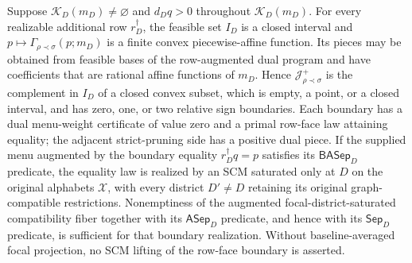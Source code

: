 Suppose \(\mathcal K_D(m_D)\ne\varnothing\) and \(d_Dq>0\) throughout \(\mathcal K_D(m_D)\). For every realizable additional row \(r_D^\dagger\), the feasible set \(I_D\) is a closed interval and \(p\mapsto\Gamma_{\rho\prec\sigma}(p;m_D)\) is a finite convex piecewise-affine function. Its pieces may be obtained from feasible bases of the row-augmented dual program and have coefficients that are rational affine functions of \(m_D\). Hence \(\mathcal J_{\rho\prec\sigma}^+\) is the complement in \(I_D\) of a closed convex subset, which is empty, a point, or a closed interval, and has zero, one, or two relative sign boundaries. Each boundary has a dual menu-weight certificate of value zero and a primal row-face law attaining equality; the adjacent strict-pruning side has a positive dual piece. If the supplied menu augmented by the boundary equality \(r_D^\dagger q=p\) satisfies its \(\mathsf{BASep}_D\) predicate, the equality law is realized by an SCM saturated only at \(D\) on the original alphabets \(\mathcal X\), with every district \(D'\ne D\) retaining its original graph-compatible restrictions. Nonemptiness of the augmented focal-district-saturated compatibility fiber together with its \(\mathsf{ASep}_D\) predicate, and hence with its \(\mathsf{Sep}_D\) predicate, is sufficient for that boundary realization. Without baseline-averaged focal projection, no SCM lifting of the row-face boundary is asserted.